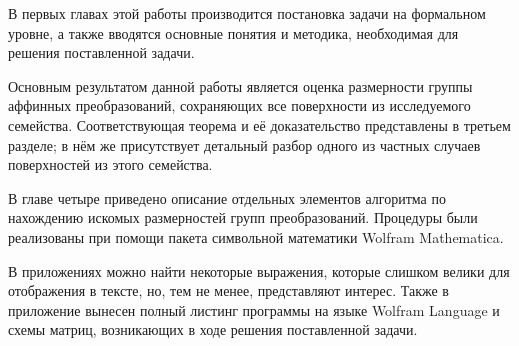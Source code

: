 \documentclass[../main.tex]{subfiles}
\begin{document}
В первых главах этой работы производится постановка задачи на формальном уровне, а также вводятся основные понятия и методика, необходимая для решения поставленной задачи.

Основным результатом данной работы является оценка размерности группы аффинных преобразований, сохраняющих все поверхности из исследуемого семейства. Соответствующая теорема и её доказательство представлены в третьем разделе; в нём же присутствует детальный разбор одного из частных случаев поверхностей из этого семейства.

В главе четыре приведено описание отдельных элементов алгоритма по нахождению искомых размерностей групп преобразований. Процедуры были реализованы при помощи пакета символьной математики {\ttfamily Wolfram Mathematica}.

В приложениях можно найти некоторые выражения, которые слишком велики для отображения в тексте, но, тем не менее, представляют интерес. Также в приложение вынесен полный листинг программы на языке {\ttfamily Wolfram Language} и схемы матриц, возникающих в ходе решения поставленной задачи.
\end{document}
